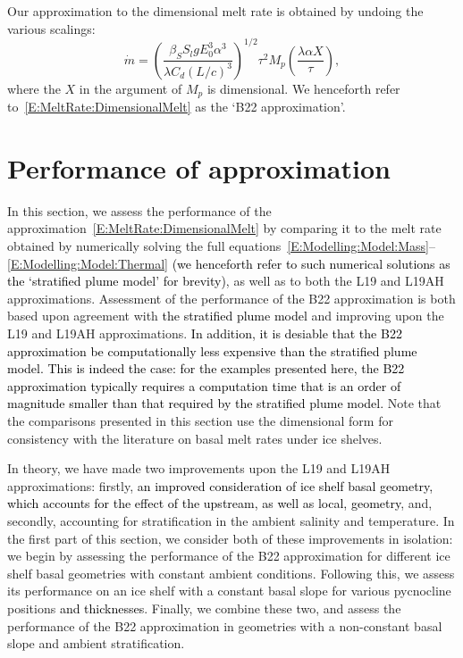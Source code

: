 \documentclass[openacc]{rsproca_new}%
\newcommand{\red}[1]{{\color{red} #1}}
\newcommand{\blue}[1]{{\color{blue} #1}}
\newcommand{\rout}[1]{\red{\st{#1}}}\newcommand{\ab}[1]{\textcolor{Green}{#1}}\newcommand{\about}[1]{\textcolor{Cyan}{\sout{#1}}}
\renewcommand{\rout}[1]{{}} %
\renewcommand{\blue}[1]{{\textcolor{black}{#1}}} %
\renewcommand{\red}[1]{{}} %
\begin{document}
Our approximation to the dimensional melt rate is obtained by undoing the various scalings:
\begin{equation}\label{E:MeltRate:DimensionalMelt}
\dot{m} =\left(\frac{\beta_S S_l g  E_0^3 \alpha^3}{\lambda C_d (L/c)^3}\right)^{1/2} \tau^2  M_p\left(\frac{\lambda \alpha X}{\tau}\right),
\end{equation}
where the $X$ in the argument of $M_p$ is dimensional. We henceforth refer to~\eqref{E:MeltRate:DimensionalMelt} as the `B22 approximation'.

\section{Performance of approximation}\label{S:Numerics}
In this section, we assess the performance of the approximation~\eqref{E:MeltRate:DimensionalMelt} by comparing it to the melt rate obtained by numerically solving the full equations~\eqref{E:Modelling:Model:Mass}--\eqref{E:Modelling:Model:Thermal} \blue{(we henceforth refer to such numerical solutions as the `stratified plume model' for brevity)}, as well as to both the L19 and L19AH approximations. Assessment of the performance of the B22 approximation is both based upon agreement with \rout{numerical solutions }\blue{the stratified plume model} and improving upon the L19 and L19AH approximations. \blue{In addition, it is desiable that the B22 approximation be computationally less expensive than the stratified plume model. This is indeed the case: for the examples presented here, the B22 approximation typically requires a computation time that is an order of magnitude smaller than that required by the stratified plume model.} Note that the comparisons presented in this section use the dimensional form for consistency with the literature on basal melt rates under ice shelves.

In theory, we have made two improvements upon the L19 and L19AH approximations: firstly, \blue{an improved consideration of ice shelf basal geometry, which accounts for the effect of the upstream, as well as local, geometry}\rout{accounting for a general ice shelf basal geometry and capturing non-local geometric effects}, and, secondly, accounting for stratification in the ambient salinity and temperature. In the first part of this section, we consider both of these improvements in isolation: we begin by assessing the performance of the B22 approximation for different ice shelf basal geometries with constant ambient conditions. Following this, we assess its performance on an ice shelf with a constant basal slope for various pycnocline positions \blue{and thicknesses}. Finally, we combine these two, and assess the performance of the B22 approximation in geometries with a non-constant basal slope and ambient stratification.
\end{document}
